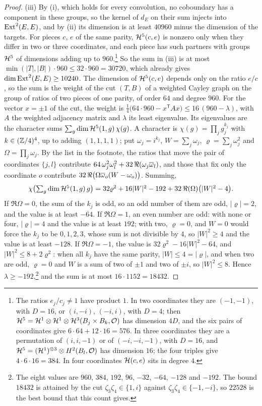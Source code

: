 \begin{proof}
(iii) By (i), which holds for every convolution, no
coboundary has a component in these groups, so the kernel of $d_{E}$ on
their sum injects into $\operatorname{Ext}^{2}(E,E)$, and by (ii) its dimension is at
least $40960$ minus the dimension of the targets. For pieces $c$, $e$ of the
same parity, $\mathcal{H}^{5}(c,e)$ is nonzero only when they differ in two or three
coordinates, and each piece has such partners with groups $\mathcal{H}^{5}$ of
dimensions adding up to $960$.\footnote{The ratios $e_{j}/c_{j}\ne1$ have
product $1$. In two coordinates they are $(-1,-1)$, with $D=16$, or
$(i,-i)$, $(-i,i)$, with $D=4$; then
$\mathcal{H}^{5}=\mathcal{H}^{1}\otimes\mathcal{H}^{1}\otimes\mathcal{H}^{3}(B_{j}\times B_{k},\mathcal{O})$ has
dimension $4D$, and the six pairs of coordinates give
$6\cdot64+12\cdot16=576$. In three coordinates they are a permutation of
$(i,i,-1)$ or of $(-i,-i,-1)$, with $D=16$, and
$\mathcal{H}^{5}=(\mathcal{H}^{1})^{\otimes3}\otimes H^{2}(B_{l},\mathcal{O})$ has dimension $16$;
the four triples give $4\cdot6\cdot16=384$. In four coordinates
$\mathcal{H}(c,e)$ sits in degree $4$.} So the sum in (iii) is at most
$\min(|T|,|B|)\cdot960\le32\cdot960=30720$, which already gives
$\dim\operatorname{Ext}^{2}(E,E)\ge10240$. The dimension of $\mathcal{H}^{5}(c,e)$ depends only on
the ratio $e/c$, so the sum is the weight of the cut $(T,B)$ of a weighted
Cayley graph on the group of ratios of two pieces of one parity, of order
$64$ and degree $960$. For the vector $x=\pm1$ of the cut, the weight is
$\tfrac14\bigl(64\cdot960-x^{\mathsf T}Ax\bigr)\le16\,(960-\lambda)$, with
$A$ the weighted adjacency matrix and $\lambda$ its least eigenvalue. Its
eigenvalues are the character sums $\sum_{g}\dim\mathcal{H}^{5}(1,g)\,\chi(g)$. A
character is $\chi(g)=\prod_{j}g_{j}^{k_{j}}$ with $k\in(\mathbb{Z}/4)^{4}$, up to
adding $(1,1,1,1)$; put $\omega_{j}=i^{k_{j}}$, $W=\sum_{j}\omega_{j}$,
$\varrho=\sum_{j}\omega_{j}^{2}$ and $\Omega=\prod_{j}\omega_{j}$. By the
list in the footnote, the ratios that move the pair of coordinates
$\{j,l\}$ contribute $64\,\omega_{j}^{2}\omega_{l}^{2}
+32\,\Re(\omega_{j}\overline{\omega}_{l})$, and those that fix only the
coordinate $o$ contribute $32\,\Re\bigl(\Omega\overline{\omega}_{o}(W-\omega_{o})\bigr)$.
Summing,
\[
  \chi\bigl(\textstyle\sum_{g}\dim\mathcal{H}^{5}(1,g)\,g\bigr)
  =32\varrho^{2}+16|W|^{2}-192+32\,\Re(\Omega)\bigl(|W|^{2}-4\bigr).
\]
If $\Re\Omega=0$, the sum of the $k_{j}$ is odd, so an odd number of them
are odd, $|\varrho|=2$, and the value is at least $-64$. If $\Re\Omega=1$,
an even number are odd: with none or four, $|\varrho|=4$ and the value is at
least $192$; with two, $\varrho=0$, and $W=0$ would force the $k_{j}$ to be
$0,1,2,3$, whose sum is not divisible by $4$, so $|W|^{2}\ge4$ and the value
is at least $-128$. If $\Re\Omega=-1$, the value is
$32\varrho^{2}-16|W|^{2}-64$, and $|W|^{2}\le8+2\varrho^{2}$: when all
$k_{j}$ have the same parity, $|W|\le4=|\varrho|$, and when two are odd,
$\varrho=0$ and $W$ is a sum of two of $\pm1$ and two of $\pm i$, so
$|W|^{2}\le8$. Hence $\lambda\ge-192$,\footnote{The eight values are $960$,
$384$, $192$, $96$, $-32$, $-64$, $-128$ and $-192$. The bound $18432$ is
attained by the cut $\zeta_{3}\zeta_{4}\in\{1,i\}$ against
$\zeta_{3}\zeta_{4}\in\{-1,-i\}$, so $22528$ is the best bound that this
count gives.} and the sum is at most $16\cdot1152=18432$.
\end{proof}

